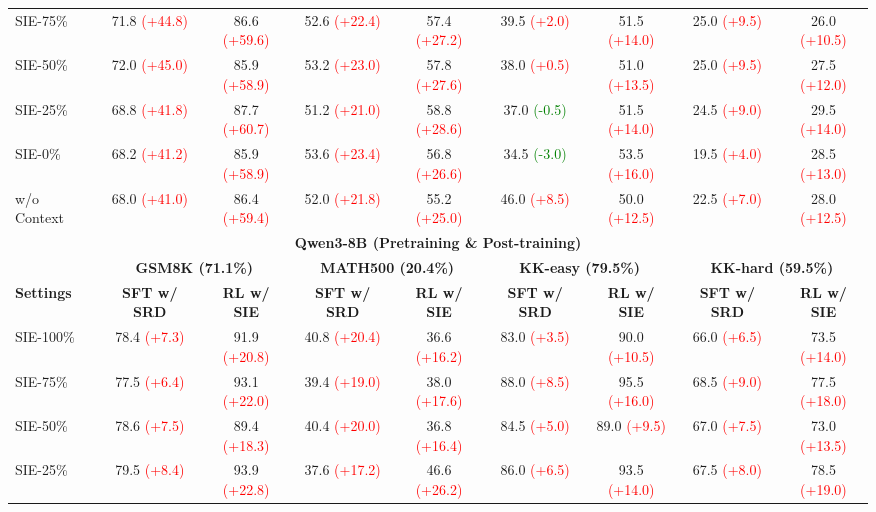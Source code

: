 \documentclass{article} %
\newcommand{\posgain}[1]{\textcolor{red}{(+#1)}}
\newcommand{\neggain}[1]{\textcolor{green}{(-#1)}}
\begin{document}
\begin{table}[t!]
{\begin{tabular}{l cc cc cc cc}
SIE-75\% & 71.8 \posgain{44.8} & 86.6 \posgain{59.6} & 52.6 \posgain{22.4} & 57.4 \posgain{27.2} & 39.5 \posgain{2.0} & 51.5 \posgain{14.0} & 25.0 \posgain{9.5} & 26.0 \posgain{10.5} \\
SIE-50\% & 72.0 \posgain{45.0} & 85.9 \posgain{58.9} & 53.2 \posgain{23.0} & 57.8 \posgain{27.6} & 38.0 \posgain{0.5} & 51.0 \posgain{13.5} & 25.0 \posgain{9.5} & 27.5 \posgain{12.0} \\
SIE-25\%       & 68.8 \posgain{41.8} & 87.7 \posgain{60.7} & 51.2 \posgain{21.0} & 58.8 \posgain{28.6} & 37.0 \neggain{0.5} & 51.5 \posgain{14.0} & 24.5 \posgain{9.0} & 29.5 \posgain{14.0} \\
SIE-0\%       & 68.2 \posgain{41.2} & 85.9 \posgain{58.9} & 53.6 \posgain{23.4} & 56.8 \posgain{26.6} & 34.5 \neggain{3.0} & 53.5 \posgain{16.0} & 19.5 \posgain{4.0} & 28.5 \posgain{13.0} \\
w/o Context & 68.0 \posgain{41.0} & 86.4 \posgain{59.4} & 52.0 \posgain{21.8} & 55.2 \posgain{25.0} & 46.0 \posgain{8.5} & 50.0 \posgain{12.5} & 22.5 \posgain{7.0} & 28.0 \posgain{12.5} \\
\midrule[1.5pt] %
\multicolumn{9}{c}{\large\textbf{Qwen3-8B (Pretraining \& Post-training)}} \\
\midrule
& \multicolumn{2}{c}{\textbf{GSM8K (71.1\%)}} & \multicolumn{2}{c}{\textbf{MATH500 (20.4\%)}} & \multicolumn{2}{c}{\textbf{KK-easy (79.5\%)}} & \multicolumn{2}{c}{\textbf{KK-hard (59.5\%)}} \\
\cmidrule(lr){2-3} \cmidrule(lr){4-5} \cmidrule(lr){6-7} \cmidrule(lr){8-9}
\textbf{Settings} & \textbf{SFT w/ SRD} & \textbf{RL w/ SIE} & \textbf{SFT w/ SRD} & \textbf{RL w/ SIE} & \textbf{SFT w/ SRD} & \textbf{RL w/ SIE} & \textbf{SFT w/ SRD} & \textbf{RL w/ SIE} \\
\midrule
SIE-100\% & 78.4 \posgain{7.3} & 91.9 \posgain{20.8} & 40.8 \posgain{20.4} & 36.6 \posgain{16.2} & 83.0 \posgain{3.5} & 90.0 \posgain{10.5} & 66.0 \posgain{6.5} & 73.5 \posgain{14.0} \\
SIE-75\% & 77.5 \posgain{6.4} & 93.1 \posgain{22.0} & 39.4 \posgain{19.0} & 38.0 \posgain{17.6} & 88.0 \posgain{8.5} & 95.5 \posgain{16.0} & 68.5 \posgain{9.0} & 77.5 \posgain{18.0} \\
SIE-50\% & 78.6 \posgain{7.5} & 89.4 \posgain{18.3} & 40.4 \posgain{20.0} & 36.8 \posgain{16.4} & 84.5 \posgain{5.0} & 89.0 \posgain{9.5} & 67.0 \posgain{7.5} & 73.0 \posgain{13.5} \\
SIE-25\%       & 79.5 \posgain{8.4} & 93.9 \posgain{22.8} & 37.6 \posgain{17.2} & 46.6 \posgain{26.2} & 86.0 \posgain{6.5} & 93.5 \posgain{14.0} & 67.5 \posgain{8.0} & 78.5 \posgain{19.0} \\

\end{tabular}}
\end{table}
\end{document}
